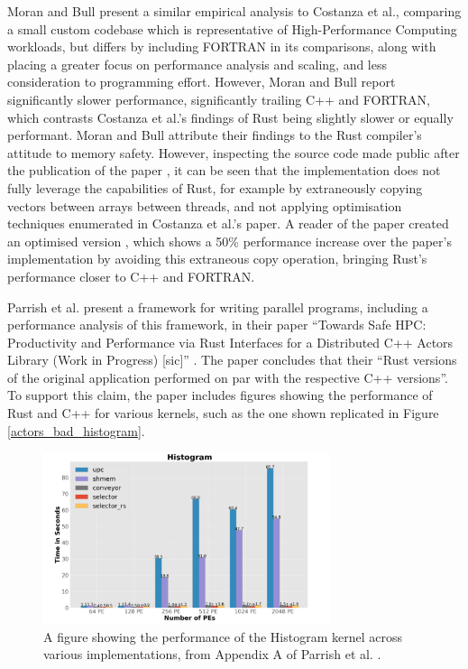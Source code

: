Moran and Bull present a similar empirical analysis to Costanza et al., comparing a small custom codebase which is representative of High-Performance Computing workloads, but differs by including FORTRAN in its comparisons, along with placing a greater focus on performance analysis and scaling, and less consideration to programming effort. However, Moran and Bull report significantly slower performance, significantly trailing C++ and FORTRAN, which contrasts Costanza et al.'s findings of Rust being slightly slower or equally performant. Moran and Bull attribute their findings to the Rust compiler's attitude to memory safety. However, inspecting the source code made public after the publication of the paper \cite{Lmoran94Eurocc_cfdCFD}, it can be seen that the implementation does not fully leverage the capabilities of Rust, for example by extraneously copying vectors between arrays between threads, and not applying optimisation techniques enumerated in Costanza et al.'s paper. A reader of the paper created an optimised version  \cite{moranPaperFalse} \cite{phazer99HerePlayground2023}, which shows a 50\% performance increase over the paper's implementation by avoiding this extraneous copy operation, bringing Rust's performance closer to C++ and FORTRAN.


Parrish et al. present a framework for writing parallel programs, including a performance analysis of this framework, in their paper ``Towards Safe HPC: Productivity and Performance via Rust Interfaces for a Distributed C++ Actors Library (Work in Progress) [sic]'' \cite{parrishSafeHPCProductivity2023}. The paper concludes that their ``Rust versions of the original application performed on par with the respective C++ versions''. To support this claim, the paper includes figures showing the performance of Rust and C++ for various kernels, such as the one shown replicated in Figure \ref{actors_bad_histogram}.

\begin{figure}[H]
    \centering
    \includegraphics[width=0.75\textwidth]{images/2_background/actors_bad_histogram.png}
    \caption{A figure showing the performance of the Histogram kernel across various implementations, from Appendix A of Parrish et al. \cite{parrishSafeHPCProductivity2023}.}
    \label{fig:actors_bad_histogram}
\end{figure}

